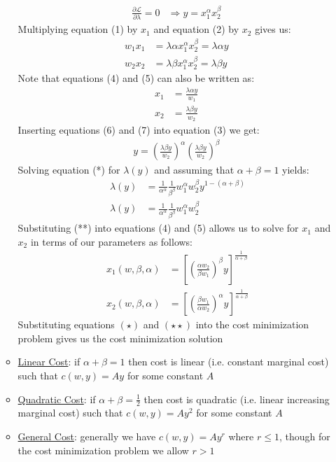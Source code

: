 \documentclass{article}
\begin{document}
\begin{itemize}
\begin{itemize}
\begin{align*}
        \frac{\partial \mathcal{L}}{\partial \lambda} = 0 &\Rightarrow y = x_{1}^{\alpha}x_{2}^{\beta} \ \tag{3}
      \end{align*}
      Multiplying equation (1) by $x_{1}$ and equation (2) by $x_{2}$ gives us:
      \begin{align*}
        w_{1}x_{1} &= \lambda \alpha x_{1}^{\alpha}x_{2}^{\beta} = \lambda \alpha y \ \tag{4} \\
        w_{2}x_{2} &= \lambda \beta x_{1}^{\alpha}x_{2}^{\beta} = \lambda \beta y \ \tag{5}
      \end{align*}
      Note that equations (4) and (5) can also be written as:
      \begin{align*}
        x_{1} &= \frac{\lambda \alpha y}{w_{1}} \ \tag{6} \\
        x_{2} &= \frac{\lambda \beta y}{w_{2}} \ \tag{7}
      \end{align*}
      Inserting equations (6) and (7) into equation (3) we get:
      \begin{gather*}
        y = (\frac{\lambda \beta y}{w_{2}})^{\alpha} (\frac{\lambda \beta y}{w_{2}})^{\beta} \ \tag{*}
      \end{gather*}
      Solving equation (*) for $\lambda (y)$ and assuming that $\alpha + \beta = 1$ yields:
      \begin{align*}
        \lambda (y) &= \frac{1}{\alpha^{\alpha}} \frac{1}{\beta^{\beta}}w_{1}^{\alpha}w_{2}^{\beta}y^{1-(\alpha+\beta)} \\
        \lambda (y) &= \frac{1}{\alpha^{\alpha}} \frac{1}{\beta^{\beta}}w_{1}^{\alpha}w_{2}^{\beta} \ \tag{**}
      \end{align*}
       Substituting (**) into equations (4) and (5) allows us to solve for $x_{1}$ and $x_{2}$ in terms of our parameters as follows:
       \begin{align*}
         x_{1} (w, \beta, \alpha) &= [(\frac{\alpha w_{2}}{\beta w_{1}})^{\beta}y]^{\tfrac{1}{\alpha + \beta}} \tag{$\star$} \\
         x_{2} (w, \beta, \alpha) &= [(\frac{\beta w_{1}}{\alpha w_{2}})^{\alpha}y]^{\tfrac{1}{\alpha + \beta}}\tag{$\star \star$}
       \end{align*}
       Substituting equations $(\star)$ and $(\star \star)$ into the cost minimization problem gives us the cost minimization solution
      \item  \underline{Linear Cost}: if $\alpha + \beta = 1$ then cost is linear (i.e. constant marginal cost) such that $c(w, y) = Ay$ for some constant $A$
      \item  \underline{Quadratic Cost}: if $\alpha + \beta = \tfrac{1}{2}$ then cost is quadratic (i.e. linear increasing marginal cost) such that $c(w,y) = Ay^{2}$ for some constant $A$
      \item  \underline{General Cost}: generally we have $c(w,y) = Ay^{r}$ where $r \leq 1$, though for the cost minimization problem we allow $r > 1$
    \end{itemize}
  \end{itemize}
\end{document}

